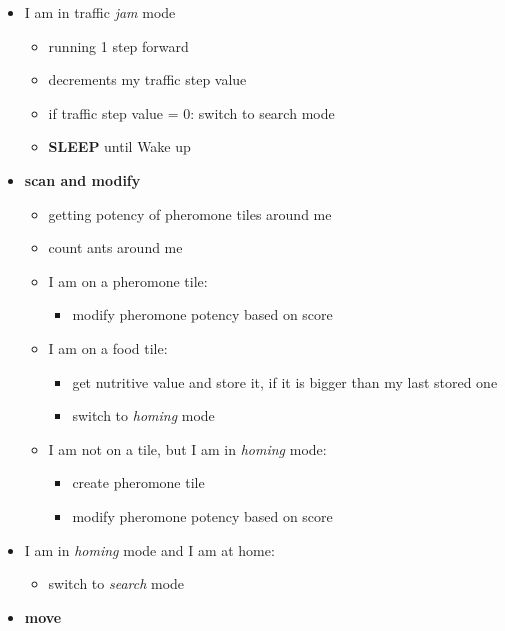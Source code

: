 \begin{itemize}
\tightlist
\item
  I am in traffic \emph{jam} mode

  \begin{itemize}
  \tightlist
  \item
    running 1 step forward
  \item
    decrements my traffic step value
  \item
    if traffic step value = 0: switch to search mode
  \item
    \textbf{SLEEP} until Wake up
  \end{itemize}
\item
  \textbf{scan and modify}

  \begin{itemize}
  \tightlist
  \item
    getting potency of pheromone tiles around me
  \item
    count ants around me
  \item
    I am on a pheromone tile:

    \begin{itemize}
    \tightlist
    \item
      modify pheromone potency based on score
    \end{itemize}
  \item
    I am on a food tile:

    \begin{itemize}
    \tightlist
    \item
      get nutritive value and store it, if it is bigger than my last
      stored one
    \item
      switch to \emph{homing} mode
    \end{itemize}
  \item
    I am not on a tile, but I am in \emph{homing} mode:

    \begin{itemize}
    \tightlist
    \item
      create pheromone tile
    \item
      modify pheromone potency based on score
    \end{itemize}
  \end{itemize}
\item
  I am in \emph{homing} mode and I am at home:

  \begin{itemize}
  \tightlist
  \item
    switch to \emph{search} mode
  \end{itemize}
\item
  \textbf{move}


\end{itemize}
